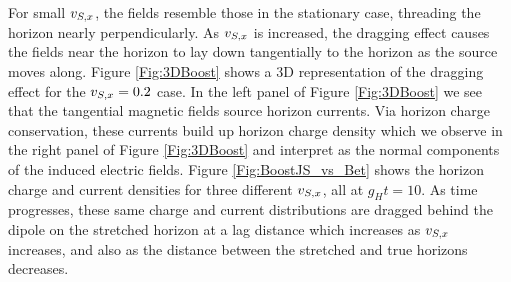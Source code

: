 For small $v_{S, x}$, the fields resemble those in the stationary case,
threading the horizon nearly perpendicularly. As $v_{S, x}$ is increased,
the dragging effect causes the fields near the horizon
to lay down tangentially to the horizon as the source moves
along. Figure \ref{Fig:3DBoost} shows a 3D representation of the dragging effect for the $v_{S, x}=0.2$ case. In the left panel of Figure \ref{Fig:3DBoost} we see that the tangential magnetic fields source horizon currents. Via horizon charge conservation, these currents build up horizon charge density which we observe in the right panel of Figure \ref{Fig:3DBoost} and interpret as the normal components of the induced electric fields. Figure \ref{Fig:BoostJS_vs_Bet} shows the
horizon charge and current densities for three different $v_{S, x}$, all at
$g_H t=10$. As time progresses, these same charge and current
distributions are dragged behind the dipole on the stretched horizon
at a lag distance which increases as $v_{S, x}$ increases, and also as the distance between the stretched
and true horizons decreases.


